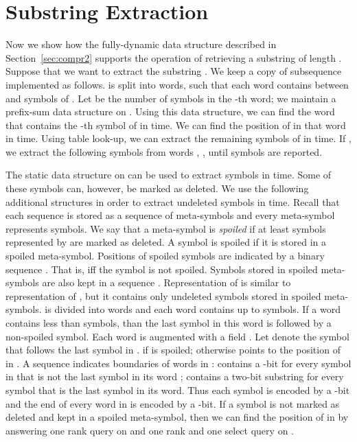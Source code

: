 \documentclass[11pt]{article}\usepackage{fullpage}
\begin{document}
\section{Substring Extraction}
\label{sec:substr}
Now we show how the fully-dynamic data structure described in Section~\ref{sec:compr2} supports the operation of retrieving a substring of length .  
Suppose that we want to extract the substring .
We keep a copy  of subsequence  implemented as follows. 
 is split into words, such that each word contains between  and  symbols of . Let  be the number of symbols in the -th word; 
we maintain a prefix-sum data structure on . Using this data structure, we can find the word  that contains the -th symbol of  in  time. We can find the position  of  in that word in  time. Using table look-up, we can extract the remaining symbols of  in  time. If , we extract the following symbols from words , ,  until  symbols are 
reported. 

The static data structure on  can be used to extract  symbols in  time. Some of these symbols can, however, be marked as deleted. We use the following additional structures in order to extract  undeleted symbols in  time.
Recall that each sequence  is stored as a sequence of meta-symbols  and every meta-symbol represents  symbols. We say that a meta-symbol  is \emph{spoiled} if at least  symbols represented by  are marked as deleted. A symbol is spoiled if it is stored in a spoiled meta-symbol. Positions of spoiled symbols are indicated by a binary sequence . That is,  iff the symbol  is not spoiled. Symbols stored in spoiled meta-symbols are also kept in a sequence . Representation of   is similar to representation of , but it contains only undeleted symbols stored in spoiled meta-symbols.  is divided into words and each word  contains up to  
symbols.  If a word  contains less than  symbols, than the last symbol in this word is followed by a non-spoiled symbol. Each word is augmented with a field . 
Let  denote the symbol that follows the last symbol in .
  if  is spoiled; otherwise  points to the position of  in . 
A sequence   indicates boundaries of words in :  contains a -bit for every symbol in  that is not the last symbol in 
its word ;  contains a two-bit substring  for every symbol that is the last symbol in its word. Thus each symbol is encoded by a -bit and the end of every word in  is encoded by a -bit. If a symbol  is not marked as deleted and kept in a spoiled meta-symbol, then we can find the position of  in  by answering one rank query on  and one rank and one select query on . 
\end{document}
